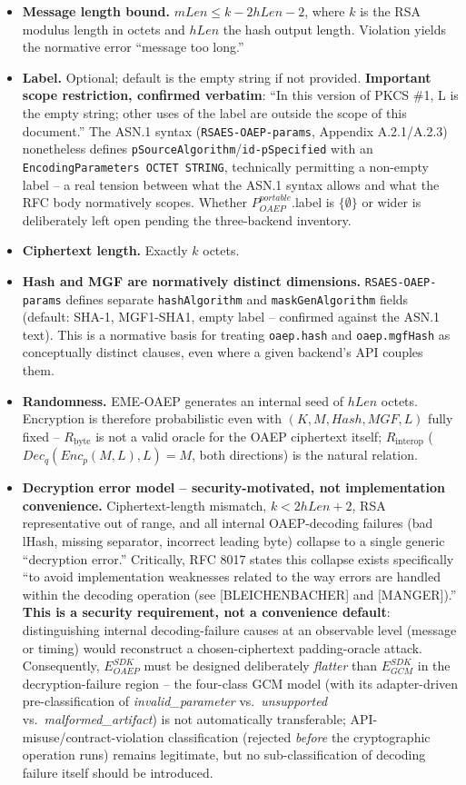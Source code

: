 \documentclass[11pt,a4paper]{article}
\begin{document}
\begin{itemize}
\item \textbf{Message length bound.} $mLen \le k - 2hLen - 2$, where $k$ is the RSA modulus length in octets and $hLen$ the hash output length. Violation yields the normative error ``message too long.''
\item \textbf{Label.} Optional; default is the empty string if not provided. \textbf{Important scope restriction, confirmed verbatim}: ``In this version of PKCS \#1, L is the empty string; other uses of the label are outside the scope of this document.'' The ASN.1 syntax (\texttt{RSAES-OAEP-params}, Appendix A.2.1/A.2.3) nonetheless defines \texttt{pSourceAlgorithm}/\texttt{id-pSpecified} with an \texttt{EncodingParameters OCTET STRING}, technically permitting a non-empty label -- a real tension between what the ASN.1 syntax allows and what the RFC body normatively scopes. Whether $P_{OAEP}^{portable}$.label is $\{\emptyset\}$ or wider is deliberately left open pending the three-backend inventory.
\item \textbf{Ciphertext length.} Exactly $k$ octets.
\item \textbf{Hash and MGF are normatively distinct dimensions.} \texttt{RSAES-OAEP-params} defines separate \texttt{hashAlgorithm} and \texttt{maskGenAlgorithm} fields (default: SHA-1, MGF1-SHA1, empty label -- confirmed against the ASN.1 text). This is a normative basis for treating \texttt{oaep.hash} and \texttt{oaep.mgfHash} as conceptually distinct clauses, even where a given backend's API couples them.
\item \textbf{Randomness.} EME-OAEP generates an internal seed of $hLen$ octets. Encryption is therefore probabilistic even with $(K, M, Hash, MGF, L)$ fully fixed -- $R_{\text{byte}}$ is not a valid oracle for the OAEP ciphertext itself; $R_{\text{interop}}$ ($Dec_q(Enc_p(M,L),L) = M$, both directions) is the natural relation.
\item \textbf{Decryption error model -- security-motivated, not implementation convenience.} Ciphertext-length mismatch, $k < 2hLen+2$, RSA representative out of range, and all internal OAEP-decoding failures (bad lHash, missing separator, incorrect leading byte) collapse to a single generic ``decryption error.'' Critically, RFC 8017 states this collapse exists specifically ``to avoid implementation weaknesses related to the way errors are handled within the decoding operation (see [BLEICHENBACHER] and [MANGER]).'' \textbf{This is a security requirement, not a convenience default}: distinguishing internal decoding-failure causes at an observable level (message or timing) would reconstruct a chosen-ciphertext padding-oracle attack. Consequently, $E_{OAEP}^{SDK}$ must be designed deliberately \emph{flatter} than $E_{GCM}^{SDK}$ in the decryption-failure region -- the four-class GCM model (with its adapter-driven pre-classification of \emph{invalid\_parameter} vs.\ \emph{unsupported} vs.\ \emph{malformed\_artifact}) is not automatically transferable; API-misuse/contract-violation classification (rejected \emph{before} the cryptographic operation runs) remains legitimate, but no sub-classification of decoding failure itself should be introduced.
\end{itemize}
\end{document}
